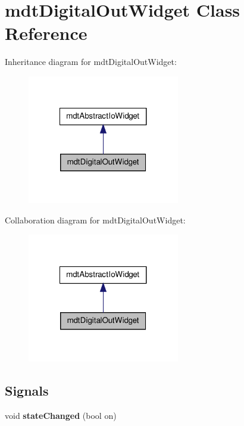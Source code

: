 \hypertarget{classmdt_digital_out_widget}{
\section{mdtDigitalOutWidget Class Reference}
\label{classmdt_digital_out_widget}
}


Inheritance diagram for mdtDigitalOutWidget:
\nopagebreak
\begin{figure}[H]
\begin{center}
\leavevmode
\includegraphics[width=188pt]{classmdt_digital_out_widget__inherit__graph}
\end{center}
\end{figure}


Collaboration diagram for mdtDigitalOutWidget:
\nopagebreak
\begin{figure}[H]
\begin{center}
\leavevmode
\includegraphics[width=188pt]{classmdt_digital_out_widget__coll__graph}
\end{center}
\end{figure}
\subsection*{Signals}
\begin{DoxyCompactItemize}
\item 
\hypertarget{classmdt_digital_out_widget_a54ff46b84613d13564e8856715b96f76}{
void {\bfseries stateChanged} (bool on)}
\label{classmdt_digital_out_widget_a54ff46b84613d13564e8856715b96f76}

\end{DoxyCompactItemize}
